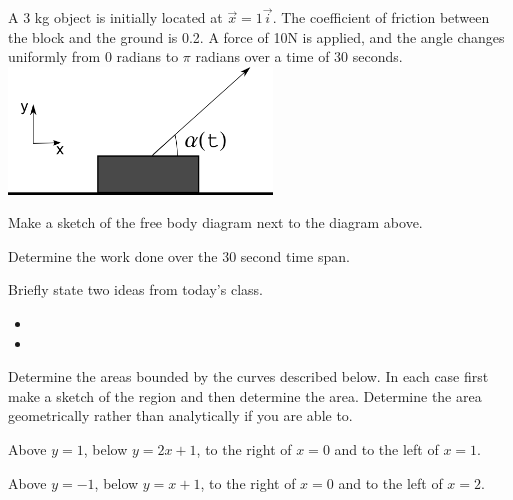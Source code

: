 \begin{problem}
\item A 3 kg object is initially located at $\vec{x}=1\vec{i}$. The
  coefficient of friction between the block and the ground is 0.2. A
  force of 10N is applied, and the angle changes uniformly from 0 radians
  to $\pi$ radians over a time of 30 seconds.\\
  \includegraphics[width=7cm]{ink/week9/workAngleChanging}
  \begin{subproblem}
    \item Make a sketch of the free body diagram next to the diagram above.
    \item Determine the work done over the 30 second time span.
      \vfill
  \end{subproblem}
\end{problem}

\postClass

\begin{problem}
\item Briefly state two ideas from today's class.
  \begin{itemize}
  \item 
  \item 
  \end{itemize}
\item 
  \begin{subproblem}
    \item
  \end{subproblem}
\end{problem}



\begin{problem}
\item Determine the areas bounded by the curves described below. In
  each case first make a sketch of the region and then determine the
  area. Determine the area geometrically rather than analytically if
  you are able to.
  \begin{subproblem}
  \item Above $y=1$, below $y=2x+1$, to the right of $x=0$ and to the
    left of $x=1$.
    \vfill
  \item Above $y=-1$, below $y=x+1$, to the right of $x=0$ and to the
    left of $x=2$.
    \vfill
  \end{subproblem}
\end{problem}



